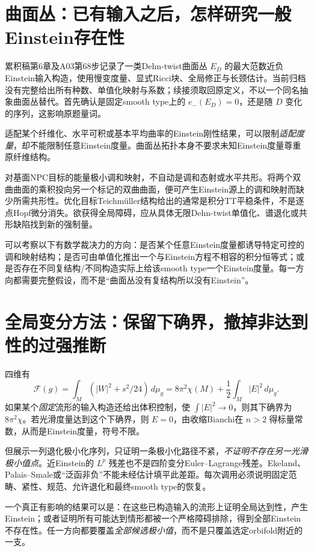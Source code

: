 \documentclass[UTF8,a4paper,11pt,fontset=fandol]{ctexart}
\numberwithin{equation}{section}
\theoremstyle{definition}
\newcommand{\dd}{\,d\mu_g}
\begin{document}
\section{曲面丛：已有输入之后，怎样研究一般Einstein存在性}
累积稿第6章及A03第68步记录了一类Dehn-twist曲面丛 $E_D$ 的最大范数近负Einstein输入构造，使用慢变度量、显式Ricci块、全局修正与长颈估计。当前归档没有完整给出所有种数、单值化映射与系数；续接须取回原定义，不以一个同名抽象曲面丛替代。首先确认是固定smooth type上的 $e_-(E_D)=0$，还是随 $D$ 变化的序列，这影响原题量词。

适配某个纤维化、水平可积或基本平均曲率的Einstein刚性结果，可以限制\emph{适配度量}，却不能限制任意Einstein度量。曲面丛拓扑本身不要求未知Einstein度量尊重原纤维结构。

对基面NPC目标的能量极小调和映射，不自动是调和态射或水平共形。将两个双曲曲面的乘积投向另一个标记的双曲曲面，便可产生Einstein源上的调和映射而缺少所需共形性。优化目标Teichm\"uller结构给出的通常是积分TT平稳条件，不是逐点Hopf微分消失。欲获得全局障碍，应从具体无限Dehn-twist单值化、谱退化或共形缺陷找到新的强制量。

可以考察以下有数学裁决力的方向：是否某个任意Einstein度量都诱导特定可控的调和映射结构；是否可由单值化推出一个与Einstein方程不相容的积分恒等式；或是否存在不同复结构/不同构造实际上给该smooth type一个Einstein度量。每一方向都需要完整假设，而不是“曲面丛没有复结构所以没有Einstein”。

\section{全局变分方法：保留下确界，撤掉非达到性的过强推断}
四维有
\begin{equation}\label{eq:F}
\mathcal F(g)=\int_M(|W|^2+s^2/24)\dd
=8\pi^2\chi(M)+\frac12\int_M|E|^2\dd.
\end{equation}
如果某个\emph{固定}流形的输入构造还给出体积控制，使 $\int|E|^2\to0$，则其下确界为 $8\pi^2\chi$。若光滑度量达到这个下确界，则 $E=0$，由收缩Bianchi在 $n>2$ 得标量常数，从而是Einstein度量，符号不限。

但展示一列退化极小化序列，只证明一条极小化路径不紧，\emph{不证明不存在另一光滑极小值点}。近Einstein的 $L^p$ 残差也不是四阶变分Euler--Lagrange残差。Ekeland、Palais--Smale或“泛函非负”不能未经估计填平此差距。每次调用必须说明固定范畴、紧性、规范、允许退化和最终smooth type的恢复。

一个真正有影响的结果可以是：在这些已构造输入的流形上证明全局达到性，产生Einstein；或者证明所有可能达到情形都被一个严格障碍排除，得到全部Einstein不存在性。任一方向都要覆盖\emph{全部候选极小值}，而不是只覆盖选定orbifold附近的一支。
\end{document}
